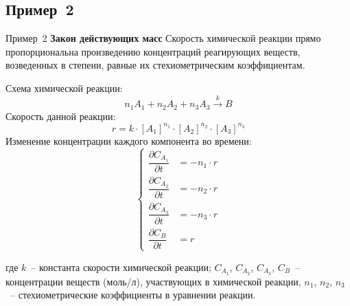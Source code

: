 \documentclass[aspectratio=169, mathserif]{beamer}	%
\begin{document}
\subsection{Пример~2}
\begin{frame}[fragile]{Пример~2}
\scriptsize
\alert{\textbf{Закон действующих масс}}
\vfill
Скорость химической реакции прямо пропорциональна произведению концентраций реагирующих веществ, возведенных в степени, равные их стехиометрическим коэффициентам.
\vfill
\begin{multicols}{2}
Схема химической реакции:
\vfill
$$
	n_1A_1 + n_2A_2 + n_3A_3 \overset{k}{\longrightarrow} B
$$
\vfill
Скорость данной реакции:
\vfill
$$
r = k \cdot \left[A_1\right]^{n_1} \cdot \left[A_2\right]^{n_2} \cdot \left[A_3\right]^{n_3}
$$
\vfill
\columnbreak
Изменение концентрации каждого компонента во времени:
\vfill
\begin{equation*}
	\left\{
	\begin{aligned}
		\dfrac{\partial C_{A_1}}{\partial t} &= -n_1 \cdot r \\
		\dfrac{\partial C_{A_2}}{\partial t} &= -n_2 \cdot r \\
		\dfrac{\partial C_{A_3}}{\partial t} &= -n_3 \cdot r \\
		\dfrac{\partial C_B}{\partial t} &= r
	\end{aligned}
	\right.
\end{equation*}
\end{multicols}
\vfill
где $k$~-- константа скорости химической реакции; $C_{A_1}$, $C_{A_2}$, $C_{A_3}$, $C_B$~-- концентрации веществ (моль/л), участвующих в химической реакции, $n_1$, $n_2$, $n_3$~-- стехиометрические коэффициенты в уравнении реакции.
\vfill
\end{frame}
\end{document}
